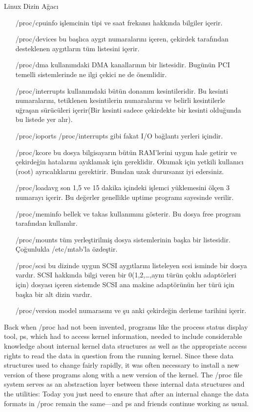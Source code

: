 \begin{section}{Linux Dizin Ağacı}
\begin{itemize}
\item[/proc/cpuinfo]işlemcinin tipi ve saat frekansı hakkında bilgiler içerir.
\item[/proc/devices]bu başlıca aygıt numaralarını içeren, çekirdek tarafından desteklenen aygıtların tüm listesini içerir.
\item[/proc/dma]kullanımdaki DMA kanallarının bir listesidir. Bugünün PCI temelli sistemlerinde ne ilgi çekici ne de önemlidir.
\item[/proc/interrupts]kullanımdaki bütün donanım kesintileridir. Bu kesinti numaralarını, tetiklenen kesintilerin numaralarını ve belirli kesintilerle uğraşan sürücüleri içerir(Bir kesinti sadece çekirdekte bir kesinti olduğunda bu listede yer alır).
\item[/proc/ioports]/proc/interrupts gibi fakat I/O bağlantı yerleri içindir.
\item[/proc/kcore]bu dosya bilgisayarın bütün RAM’lerini uygun hale getirir ve çekirdeğin hatalarını ayıklamak için gereklidir. Okumak için yetkili kullanıcı (root) ayrıcalıklarını gerektirir.  Bundan uzak durursanız iyi edersiniz.
\item[/proc/loadavg]son 1,5 ve 15 dakika içindeki işlemci yüklemesini ölçen 3 numarayı içerir. Bu değerler genellikle uptime programı sayesinde verilir.
\item[/proc/meminfo]bellek ve takas kullanımını gösterir. Bu dosya free program tarafından kullanılır.
\item[/proc/mounts]tüm yerleştirilmiş dosya sistemlerinin başka bir listesidir. Çoğunlukla /etc/mtab’la özdeştir.
\item[/proc/scsi]bu dizinde  uygun SCSI aygıtlarını listeleyen scsi isminde bir dosya vardır. SCSI hakkında bilgi veren bir 0(1,2,…,aynı türün çoklu adaptörleri için) dosyası içeren sistemde SCSI ana makine adaptörünün her  türü için başka bir alt dizin vardır.
\item[/proc/version]model numarasını ve şu anki çekirdeğin derleme tarihini içerir.
\end{itemize}

Back when /proc had not been invented, programs like the process status display tool, ps, which had to access kernel information, needed to include considerable knowledge about internal kernel data structures as well as the appropriate access rights to read the data in question from the running kernel. Since these data structures used to change fairly rapidly, it was often necessary to install a new version of these programs along with a new version of the kernel. The /proc file system serves as an abstraction layer between these internal data structures and the utilities: Today you just need to ensure that after an internal change the data formats in /proc remain the same—and ps and friends continue working as usual.


\end{section}
